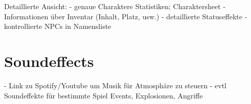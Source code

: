 \documentclass[11pt]{article}
\begin{document}
    Detaillierte Ansicht:
    - genaue Charaktere Statistiken; Charaktersheet
    - Informationen über Inventar (Inhalt, Platz, usw.)
    - detaillierte Statuseffekte
    - kontrollierte NPCs in Namensliste

    \section{Soundeffects}\label{sec:soundeffects}
    - Link zu Spotify/Youtube um Musik für Atmosphäre zu steuern
    - evtl Soundeffekte für bestimmte Spiel Events, Explosionen, Angriffe
\end{document}
